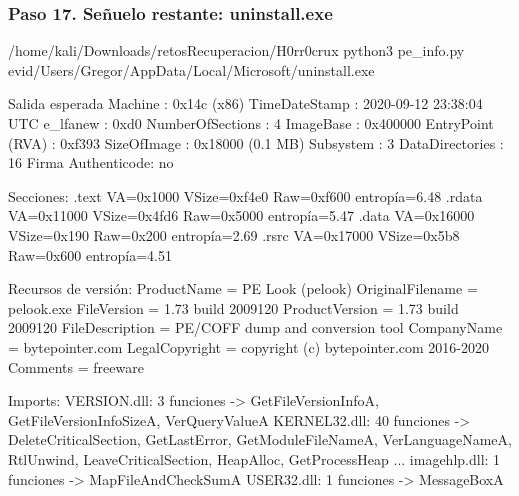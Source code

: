 \documentclass[11pt,a4paper]{article}
\begin{document}
\subsubsection*{Paso 17. Señuelo restante: uninstall.exe}
\begin{comando}{/home/kali/Downloads/retosRecuperacion/H0rr0crux}
python3 pe_info.py evid/Users/Gregor/AppData/Local/Microsoft/uninstall.exe
\end{comando}
\begin{salidan}{Salida esperada}
Machine          : 0x14c  (x86)
TimeDateStamp    : 2020-09-12 23:38:04 UTC
e_lfanew         : 0xd0
NumberOfSections : 4
ImageBase        : 0x400000
EntryPoint (RVA) : 0xf393
SizeOfImage      : 0x18000  (0.1 MB)
Subsystem        : 3
DataDirectories  : 16
Firma Authenticode: no

Secciones:
  .text    VA=0x1000    VSize=0xf4e0    Raw=0xf600   entropía=6.48
  .rdata   VA=0x11000   VSize=0x4fd6    Raw=0x5000   entropía=5.47
  .data    VA=0x16000   VSize=0x190     Raw=0x200    entropía=2.69
  .rsrc    VA=0x17000   VSize=0x5b8     Raw=0x600    entropía=4.51

Recursos de versión:
  ProductName        = PE Look (pelook)
  OriginalFilename   = pelook.exe
  FileVersion        = 1.73 build 2009120
  ProductVersion     = 1.73 build 2009120
  FileDescription    = PE/COFF dump and conversion tool
  CompanyName        = bytepointer.com
  LegalCopyright     = copyright (c) bytepointer.com 2016-2020
  Comments           = freeware

Imports:
  VERSION.dll: 3 funciones -> GetFileVersionInfoA, GetFileVersionInfoSizeA, VerQueryValueA
  KERNEL32.dll: 40 funciones -> DeleteCriticalSection, GetLastError, GetModuleFileNameA, VerLanguageNameA, RtlUnwind, LeaveCriticalSection, HeapAlloc, GetProcessHeap ...
  imagehlp.dll: 1 funciones -> MapFileAndCheckSumA
  USER32.dll: 1 funciones -> MessageBoxA
\end{salidan}
\end{document}
